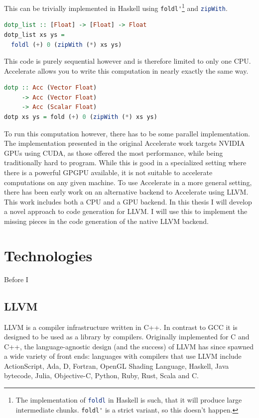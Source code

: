 \documentclass[a4paper,bibliography=totocnumbered,parskip,headsepline]{scrbook}
\begin{document}
This can be trivially implemented in Haskell using \lstinline[language=haskell]!foldl'!\footnote{The implementation of \lstinline[language=haskell]!foldl! in Haskell is such, that it will produce large intermediate chunks. \lstinline[language=haskell]!foldl'! is a strict variant, so this doesn't happen.} and \lstinline[language=haskell]!zipWith!.
\begin{lstlisting}[language=haskell]
dotp_list :: [Float] -> [Float] -> Float
dotp_list xs ys =
  foldl (+) 0 (zipWith (*) xs ys)
\end{lstlisting}
This code is purely sequential however and is therefore limited to only one CPU.
Accelerate allows you to write this computation in nearly exactly the same way.
\begin{lstlisting}[language=haskell]
dotp :: Acc (Vector Float)
     -> Acc (Vector Float)
     -> Acc (Scalar Float)
dotp xs ys = fold (+) 0 (zipWith (*) xs ys)
\end{lstlisting}
To run this computation however, there has to be some parallel implementation.
The implementation presented in the original Accelerate work targets NVIDIA GPUs using CUDA, as those offered the most performance, while being traditionally hard to program.
While this is good in a specialized setting where there is a powerful GPGPU available, it is not suitable to accelerate computations on any given machine.
To use Accelerate in a more general setting, there has been early work on an alternative backend to Accelerate using LLVM.\cite{trevor2014llvm}
This work includes both a CPU and a GPU backend.
In this thesis I will develop a novel approach to code generation for LLVM.
I will use this to implement the missing pieces in the code generation of the native LLVM backend.


\chapter{Technologies}
Before I 

\section{LLVM}
LLVM\cite{lattner2002llvm} is a compiler infrastructure written in C++.
In contrast to GCC it is designed to be used as a library by compilers.
Originally implemented for C and C++, the language-agnostic design (and the success) of LLVM has since spawned a wide variety of front ends: languages with compilers that use LLVM include ActionScript, Ada, D, Fortran, OpenGL Shading Language, Haskell, Java bytecode, Julia, Objective-C, Python, Ruby, Rust, Scala and C.
\end{document}
